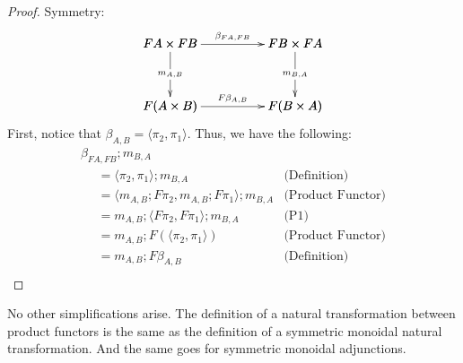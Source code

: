 \begin{proof}
\item[] Symmetry:\\
  \[
  \bfig
  \square|amma|/->`->`->`->/<1000,500>[
    FA \times FB`
    FB \times FA`
    F(A \times B)`
    F(B \times A);
    {\beta}_{FA,FB}`
    m_{A,B}`
    m_{B,A}`
    F{\beta}_{A,B}]
  \efig
  \]
  First, notice that $\beta_{A,B} = \langle \pi_2, \pi_1 \rangle$.  Thus, we have the following:
  \[
  \begin{array}{lll}
    \beta_{FA,FB};m_{B,A}\\
    \,\,\,\,\,\,\,\,=  \langle \pi_2, \pi_1 \rangle;m_{B,A} & \text{(Definition)}\\
    \,\,\,\,\,\,\,\,=  \langle m_{A,B};F\pi_2, m_{A,B};F\pi_1 \rangle;m_{B,A} & \text{(Product Functor)}\\
    \,\,\,\,\,\,\,\,=  m_{A,B};\langle F\pi_2, F\pi_1 \rangle;m_{B,A} & \text{(P1)}\\
    \,\,\,\,\,\,\,\,=  m_{A,B};F(\langle \pi_2, \pi_1 \rangle) & \text{(Product Functor)}\\
    \,\,\,\,\,\,\,\,=  m_{A,B};F\beta_{A,B} & \text{(Definition)}\\
  \end{array}
  \]
\end{proof}
\fi 

No other simplifications arise.  The definition of a natural
transformation between product functors is the same as the definition
of a symmetric monoidal natural transformation. And the same goes for
symmetric monoidal adjunctions.

